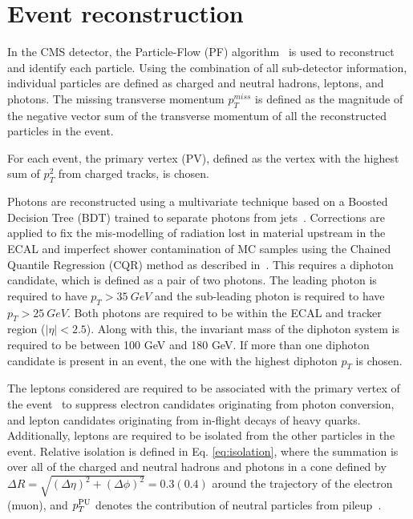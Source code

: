 \section{Event reconstruction}
\label{sec:Objects}

In the CMS detector, the Particle-Flow (PF) algorithm~\cite{Sirunyan:2017ulk} is used to reconstruct and identify each particle.
Using the combination of all sub-detector information, individual particles are defined as charged and neutral hadrons, leptons, and photons.
The missing transverse momentum $p_T^{miss}$ is defined as the magnitude of the negative vector sum of the transverse momentum of all the reconstructed particles in the event.

For each event, the primary vertex (PV), defined as the vertex with the highest sum of $p_{T}^{2}$ from charged tracks, is chosen. 

Photons are reconstructed using a multivariate technique based on a Boosted Decision Tree (BDT) trained to separate photons from jets~\cite{Sirunyan:2018ouh}.
Corrections are applied to fix the mis-modelling of radiation lost in material upstream in the ECAL
and imperfect shower contamination of MC samples using the Chained Quantile Regression (CQR) method as described in~\cite{Khachatryan:2014ira}.
This requires a diphoton candidate, which is defined as a pair of two photons.
The leading photon is required to have $p_T > 35 ~GeV$ and the sub-leading photon is required to have $p_T > 25 ~GeV$.
Both photons are required to be within the ECAL and tracker region ($|\eta| < 2.5$). Along with this,
the invariant mass of the diphoton system is required to be between 100 GeV and 180 GeV.
If more than one diphoton candidate is present in an event, the one with the highest diphoton $p_T$ is chosen.

The leptons considered are required to be associated with the primary vertex of the event~\cite{Chatrchyan:2014fea}
to suppress electron candidates originating from photon conversion, and lepton candidates originating
from in-flight decays of heavy quarks. Additionally, leptons are required to be isolated from the other particles in the event.
Relative isolation is defined in Eq. \ref{eq:isolation}, where the summation is over all of the charged and neutral hadrons and photons
in a cone defined by $\Delta R = \sqrt{(\Delta \eta)^2 + (\Delta \phi)^2} = 0.3 (0.4)$ around the trajectory of the electron (muon), 
and $p_T^{\textnormal{PU}}$ denotes the contribution of neutral particles from pileup~\cite{Khachatryan:2015hwa,Sirunyan:2018fpa}.
 
